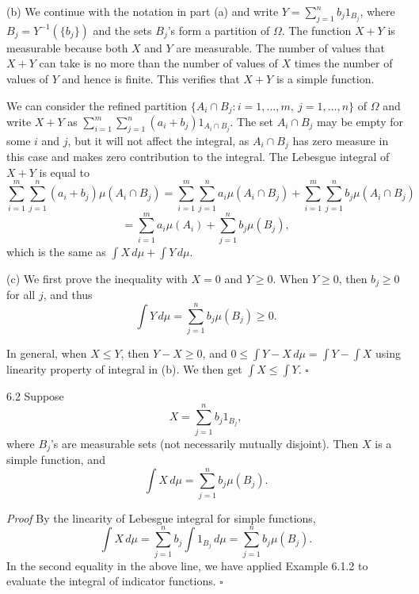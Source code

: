 (b) We continue with the notation in part (a) and write $Y=\sum_{j=1}^{n} b_j 1_{B_j}$, where $B_j=Y^{-1}(\{b_j\})$ and the sets $B_j$'s form a partition of $\Omega$. The function $X+Y$ is measurable because both $X$ and $Y$ are measurable. The number of values that $X+Y$ can take is no more than the number of values of $X$ times the number of values of $Y$ and hence is finite. This verifies that $X+Y$ is a simple function.

We can consider the refined partition $\{A_i \cap B_j : i=1,\ldots,m,\ j=1,\ldots,n\}$ of $\Omega$ and write $X+Y$ as $\sum_{i=1}^{m}\sum_{j=1}^{n}(a_i+b_j)1_{A_i \cap B_j}$. The set $A_i \cap B_j$ may be empty for some $i$ and $j$, but it will not affect the integral, as $A_i \cap B_j$ has zero measure in this case and makes zero contribution to the integral. The Lebesgue integral of $X+Y$ is equal to
\[
\sum_{i=1}^{m}\sum_{j=1}^{n}(a_i+b_j)\mu(A_i \cap B_j)
= \sum_{i=1}^{m}\sum_{j=1}^{n} a_i\mu(A_i \cap B_j)+\sum_{i=1}^{m}\sum_{j=1}^{n} b_j\mu(A_i \cap B_j)
\]
\[
= \sum_{i=1}^{m} a_i\mu(A_i)+\sum_{j=1}^{n} b_j\mu(B_j),
\]
which is the same as $\int X\, d\mu + \int Y\, d\mu$.

(c) We first prove the inequality with $X=0$ and $Y\ge 0$. When $Y\ge 0$, then $b_j\ge 0$ for all $j$, and thus
\[
\int Y\, d\mu = \sum_{j=1}^{n} b_j \mu(B_j)\ge 0.
\]

In general, when $X\le Y$, then $Y-X\ge 0$, and $0\le \int Y-X\, d\mu = \int Y - \int X$ using linearity property of integral in (b). We then get $\int X\le \int Y$. \hfill $\square$

\begin{thmbox}{6.2}
Suppose
\[
X=\sum_{j=1}^{n} b_j 1_{B_j},
\]
where $B_j$'s are measurable sets (not necessarily mutually disjoint). Then $X$ is a simple function, and
\[
\int X\, d\mu = \sum_{j=1}^{n} b_j \mu(B_j).
\]
\end{thmbox}

\textit{Proof} By the linearity of Lebesgue integral for simple functions,
\[
\int X\, d\mu = \sum_{j=1}^{n} b_j \int 1_{B_j}\, d\mu = \sum_{j=1}^{n} b_j \mu(B_j).
\]
In the second equality in the above line, we have applied Example 6.1.2 to evaluate the integral of indicator functions. \hfill $\square$
